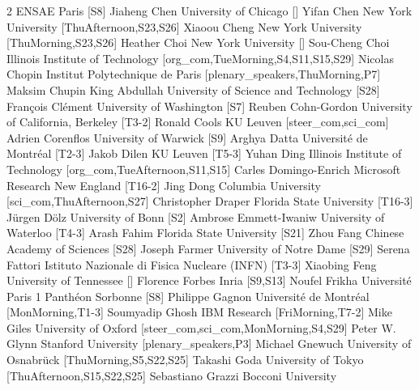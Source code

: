 \begin{multicols}{2}
  {ENSAE Paris}
  [S8]
\participantne
  {Jiaheng Chen}
  {University of Chicago}
  []
\participantne
  {Yifan Chen}
  {New York University}
  [ThuAfternoon,S23,S26]
\participantne
  {Xiaoou Cheng}
  {New York University}
  [ThuMorning,S23,S26]
\participantne
  {Heather Choi}
  {New York University}
  []
\participantne
  {Sou-Cheng Choi}
  {Illinois Institute of Technology}
  [org_com,TueMorning,S4,S11,S15,S29]
\participantne
  {Nicolas Chopin}
  {Institut Polytechnique de Paris}
  [plenary_speakers,ThuMorning,P7]
\participantne
  {Maksim Chupin}
  {King Abdullah University of Science and Technology}
  [S28]
\participantne
  {Fran\c{c}ois Cl\'ement}
  {University of Washington}
  [S7]
\participantne
  {Reuben Cohn-Gordon}
  {University of California, Berkeley}
  [T3-2]
\participantne
  {Ronald Cools}
  {KU Leuven}
  [steer_com,sci_com]
\participantne
  {Adrien Corenflos}
  {University of Warwick}
  [S9]
\participantne
  {Arghya Datta}
  {Universit\'e de Montr\'eal}
  [T2-3]
\participantne
  {Jakob Dilen}
  {KU Leuven}
  [T5-3]
\participantne
  {Yuhan Ding}
  {Illinois Institute of Technology}
  [org_com,TueAfternoon,S11,S15]
\participantne
  {Carles Domingo-Enrich}
  {Microsoft Research New England}
  [T16-2]
\participantne
  {Jing Dong}
  {Columbia University}
  [sci_com,ThuAfternoon,S27]
\participantne
  {Christopher Draper}
  {Florida State University}
  [T16-3]
\participantne
  {J\"urgen D\"olz}
  {University of Bonn}
  [S2]
\participantne
  {Ambrose Emmett-Iwaniw}
  {University of Waterloo}
  [T4-3]
\participantne
  {Arash Fahim}
  {Florida State University}
  [S21]
\participantne
  {Zhou Fang}
  {Chinese Academy of Sciences}
  [S28]
\participantne
  {Joseph Farmer}
  {University of Notre Dame}
  [S29]
\participantne
  {Serena Fattori}
  {Istituto Nazionale di Fisica Nucleare (INFN)}
  [T3-3]
\participantne
  {Xiaobing Feng}
  {University of Tennessee}
  []
\participantne
  {Florence Forbes}
  {Inria}
  [S9,S13]
\participantne
  {Noufel Frikha}
  {Universit\'e Paris 1 Panth\'eon Sorbonne}
  [S8]
\participantne
  {Philippe Gagnon}
  {Universit\'e de Montr\'eal}
  [MonMorning,T1-3]
\participantne
  {Soumyadip Ghosh}
  {IBM Research}
  [FriMorning,T7-2]
\participantne
  {Mike Giles}
  {University of Oxford}
  [steer_com,sci_com,MonMorning,S4,S29]
\participantne
  {Peter W. Glynn}
  {Stanford University}
  [plenary_speakers,P3]
\participantne
  {Michael Gnewuch}
  {University of Osnabr\"uck}
  [ThuMorning,S5,S22,S25]
\participantne
  {Takashi Goda}
  {University of Tokyo}
  [ThuAfternoon,S15,S22,S25]
\participantne
  {Sebastiano Grazzi}
  {Bocconi University}

\end{multicols}
